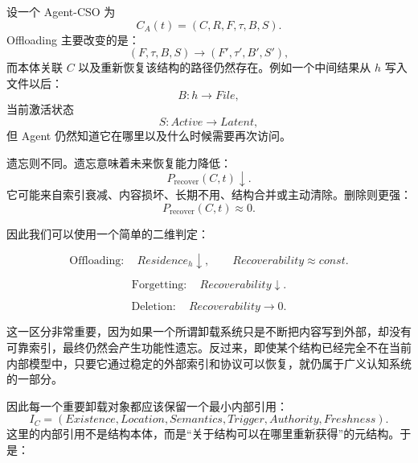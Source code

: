 设一个 Agent-CSO 为
\begin{equation}
C_A(t)
=
(C,R,F,\tau,B,S).
\end{equation}
Offloading 主要改变的是：
\begin{equation}
(F,\tau,B,S)
\rightarrow
(F',\tau',B',S'),
\end{equation}
而本体关联 $C$ 以及重新恢复该结构的路径仍然存在。例如一个中间结果从 $h$ 写入文件以后：
\begin{equation}
B:h
\rightarrow
File,
\end{equation}
当前激活状态
\begin{equation}
S:Active
\rightarrow
Latent,
\end{equation}
但 Agent 仍然知道它在哪里以及什么时候需要再次访问。

遗忘则不同。遗忘意味着未来恢复能力降低：
\begin{equation}
P_{\mathrm{recover}}(C,t)
\downarrow.
\end{equation}
它可能来自索引衰减、内容损坏、长期不用、结构合并或主动清除。删除则更强：
\begin{equation}
P_{\mathrm{recover}}(C,t)
\approx 0.
\end{equation}

因此我们可以使用一个简单的二维判定：

\begin{equation}
\mathrm{Offloading}
:
\quad
Residence_h\downarrow,
\qquad
Recoverability\approx const.
\end{equation}

\begin{equation}
\mathrm{Forgetting}
:
\quad
Recoverability\downarrow.
\end{equation}

\begin{equation}
\mathrm{Deletion}
:
\quad
Recoverability\rightarrow0.
\end{equation}

这一区分非常重要，因为如果一个所谓卸载系统只是不断把内容写到外部，却没有可靠索引，最终仍然会产生功能性遗忘。反过来，即使某个结构已经完全不在当前内部模型中，只要它通过稳定的外部索引和协议可以恢复，就仍属于广义认知系统的一部分。

因此每一个重要卸载对象都应该保留一个最小内部引用：
\begin{equation}
I_C
=
(
Existence,
Location,
Semantics,
Trigger,
Authority,
Freshness
).
\end{equation}
这里的内部引用不是结构本体，而是“关于结构可以在哪里重新获得”的元结构。于是：
\begin{statementbox}
\centering
{}
\end{statementbox}

